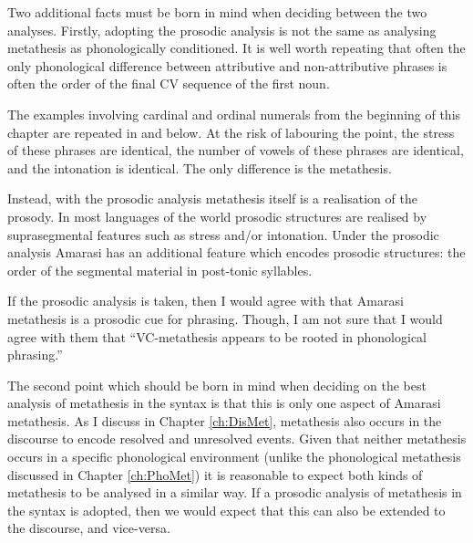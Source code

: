 Two additional facts must be born in mind
when deciding between the two analyses.
Firstly, adopting the prosodic analysis
is not the same as analysing metathesis as phonologically conditioned.
It is well worth repeating that often the only phonological difference between
attributive and non-attributive phrases is often
the order of the final CV sequence of the first noun.

The examples involving cardinal and ordinal numerals
from the beginning of this chapter are repeated
in  and  below.
At the risk of labouring the point,
the stress of these phrases are identical,
the number of vowels of these phrases are identical,
and the intonation is identical.
The only difference is the metathesis.

\begin{multicols}{2}
	\begin{exe}
	\let\eachwordone=\textnormal
	\let\eachwordtwo=\ve
		\label{ex:NenoMeseq3}
		\label{ex:NeonMeseq3}
	\end{exe}
\end{multicols}

Instead, with the prosodic analysis metathesis
itself is a realisation of the prosody.
In most languages of the world prosodic structures
are realised by suprasegmental features such as stress and/or intonation.
Under the prosodic analysis Amarasi has an additional
feature which encodes prosodic structures:
the order of the segmental material in post-tonic syllables.

If the prosodic analysis is taken, then I would agree with
\cite{hika} that Amarasi metathesis is a prosodic cue for phrasing.
Though, I am not sure that I would agree with them that
``VC-metathesis appears to be rooted in phonological phrasing.''

The second point which should be born in mind
when deciding on the best analysis of metathesis in the syntax
is that this is only one aspect of Amarasi metathesis.
As I discuss in Chapter \ref{ch:DisMet}, metathesis also
occurs in the discourse to encode resolved and unresolved events.
Given that neither metathesis occurs in a specific phonological environment
(unlike the phonological metathesis discussed in Chapter \ref{ch:PhoMet})
it is reasonable to expect both kinds of metathesis to be analysed in a similar way.
If a prosodic analysis of metathesis in the syntax is adopted,
then we would expect that this can also be extended to the discourse,
and vice-versa.

